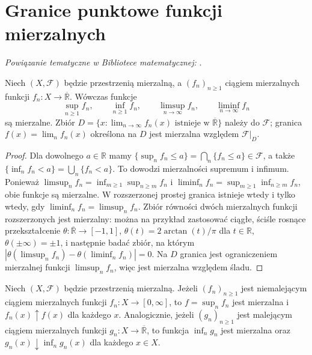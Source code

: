 \section{Granice punktowe funkcji mierzalnych}

\noindent\emph{Powiązanie tematyczne w Bibliotece matematycznej:} .


\begin{twierdzenie}
\label{thm:pointwise-limits}
Niech $(X,\mathcal F)$ będzie przestrzenią mierzalną,
a $(f_n)_{n\ge1}$ ciągiem mierzalnych funkcji
$f_n:X\to\overline{\mathbb R}$. Wówczas funkcje
\[
\sup_{n\ge1}f_n,\qquad \inf_{n\ge1}f_n,\qquad
\limsup_{n\to\infty}f_n,\qquad
\liminf_{n\to\infty}f_n
\]
są mierzalne. Zbiór
$D=\{x:\lim_{n\to\infty}f_n(x)\text{ istnieje w }
\overline{\mathbb R}\}$ należy do $\mathcal F$;
granica $f(x)=\lim_nf_n(x)$ określona na $D$ jest
mierzalna względem $\mathcal F|_D$.
\end{twierdzenie}
\begin{proof}
Dla dowolnego $a\in\mathbb R$ mamy
$\{\sup_nf_n\le a\}=\bigcap_n\{f_n\le a\}\in\mathcal F$,
a także $\{\inf_nf_n<a\}=\bigcup_n\{f_n<a\}$.
To dowodzi mierzalności supremum i infimum.
Ponieważ
$\limsup_nf_n=\inf_{m\ge1}\sup_{n\ge m}f_n$ i
$\liminf_nf_n=\sup_{m\ge1}\inf_{n\ge m}f_n$,
obie funkcje są mierzalne.
W rozszerzonej prostej granica istnieje wtedy
i tylko wtedy, gdy $\liminf_nf_n=\limsup_nf_n$.
Zbiór równości dwóch mierzalnych funkcji rozszerzonych
jest mierzalny: można na przykład zastosować
ciągłe, ściśle rosnące przekształcenie
$\theta:\overline{\mathbb R}\to[-1,1]$,
$\theta(t)=2\arctan(t)/\pi$ dla $t\in\mathbb R$,
$\theta(\pm\infty)=\pm1$, i następnie badać zbiór,
na którym $|\theta(\limsup_nf_n)-
\theta(\liminf_nf_n)|=0$.
Na $D$ granica jest ograniczeniem mierzalnej funkcji
$\limsup_nf_n$, więc jest mierzalna względem śladu.
\end{proof}

\begin{wniosek}\label{idx:06:wniosek:06}
Niech $(X,\mathcal F)$ będzie przestrzenią mierzalną.
Jeżeli $(f_n)_{n\ge1}$ jest niemalejącym ciągiem
mierzalnych funkcji $f_n:X\to[0,\infty]$,
to $f=\sup_nf_n$
jest mierzalna i $f_n(x)\uparrow f(x)$ dla każdego $x$.
Analogicznie, jeżeli $(g_n)_{n\ge1}$ jest malejącym ciągiem
mierzalnych funkcji $g_n:X\to\overline{\mathbb R}$,
to funkcja $\inf_ng_n$ jest mierzalna oraz
$g_n(x)\downarrow\inf_ng_n(x)$ dla każdego $x\in X$.
\end{wniosek}

